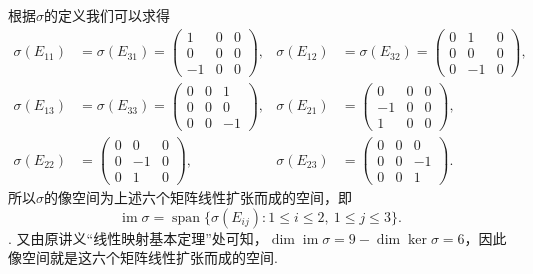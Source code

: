 \documentclass[UTF8,12pt,a4paper,fontset=fandol]{ctexart}
\begin{document}
\begin{solve}
    根据$\sigma$的定义我们可以求得
    \begin{align*}
        \sigma(E_{11})&=\sigma(E_{31})=\begin{pmatrix}
            1 & 0 & 0 \\ 0 & 0 & 0 \\ -1 & 0 & 0
        \end{pmatrix}, &
        \sigma(E_{12})&=\sigma(E_{32})=\begin{pmatrix}
            0 & 1 & 0 \\ 0 & 0 & 0 \\ 0 & -1 & 0
        \end{pmatrix}, \\
        \sigma(E_{13})&=\sigma(E_{33})=\begin{pmatrix}
            0 & 0 & 1 \\ 0 & 0 & 0 \\ 0 & 0 & -1
        \end{pmatrix}, &
        \sigma(E_{21})&=\begin{pmatrix}
            0 & 0 & 0 \\ -1 & 0 & 0 \\ 1 & 0 & 0
        \end{pmatrix}, \\
        \sigma(E_{22})&=\begin{pmatrix}
            0 & 0 & 0 \\ 0 & -1 & 0 \\ 0 & 1 & 0
        \end{pmatrix}, &
        \sigma(E_{23})&=\begin{pmatrix}
            0 & 0 & 0 \\ 0 & 0 & -1 \\ 0 & 0 & 1
        \end{pmatrix}.
    \end{align*}
    所以$\sigma$的像空间为上述六个矩阵线性扩张而成的空间，即\[\operatorname{im}\sigma=\operatorname{span}\{\sigma(E_{ij}):1\le i\le2,\ 1\le j\le3\}.\]. 又由原讲义“线性映射基本定理”处可知，$\dim\operatorname{im}\sigma=9-\dim\ker\sigma=6$，因此像空间就是这六个矩阵线性扩张而成的空间.
\end{solve}
\end{document}

